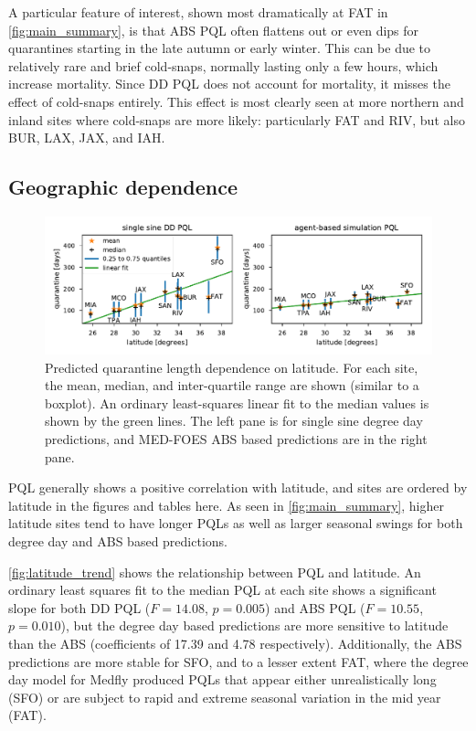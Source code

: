 \documentclass[10pt,a4paper,twocolumn]{article}
\begin{document}
A particular feature of interest, shown most dramatically at FAT in \autoref{fig:main_summary},
is that ABS PQL often flattens out or even dips for quarantines starting in the late 
autumn or early winter.  This can be due to relatively rare and brief cold-snaps,
normally lasting only a few hours, which increase mortality.
Since DD PQL does not account for mortality, it misses the effect of cold-snaps entirely.
This effect is most clearly seen at more northern and 
inland sites where cold-snaps are more likely: 
particularly FAT and RIV, but also BUR, LAX, JAX, and IAH.

\subsection*{Geographic dependence}

\begin{figure}[ht!]
\centering
\includegraphics{figs/fig_latitude_trend_withSFO.pdf}
\caption{\label{fig:latitude_trend} Predicted quarantine length dependence on latitude.
For each site, the mean, median, and inter-quartile range are shown (similar to a boxplot).
An ordinary least-squares linear fit to the median values is shown by the green lines.
The left pane is for single sine degree day predictions,
and MED-FOES ABS based predictions are in the right pane.
}
\end{figure}

PQL generally shows a positive correlation with latitude, and 
sites are ordered by latitude in the figures and tables here.
As seen in \autoref{fig:main_summary}, higher latitude sites tend to have longer PQLs
as well as larger seasonal swings for both degree day and ABS based predictions.

\autoref{fig:latitude_trend} shows the relationship between PQL and latitude.
An ordinary least squares fit to the median PQL at each site shows a significant slope for
both DD PQL ($F{=}14.08$, $p{=}0.005$) and ABS PQL ($F{=}10.55$, $p{=}0.010$), but
the degree day based predictions are more sensitive to latitude than the ABS
(coefficients of 17.39 and 4.78 respectively).
Additionally, the ABS predictions are more stable for SFO, and to a lesser extent FAT, 
where the degree day model for Medfly produced PQLs that appear either unrealistically long (SFO) 
or are subject to rapid and extreme seasonal variation in the mid year (FAT).
\end{document}
